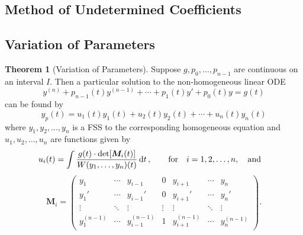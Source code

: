 \documentclass[10pt,UTF8]{article}
\newcommand{\mat}[1]{\bm{#1}}
\newenvironment{theoremBox}
{
  \begin{tcolorbox}[colback=yellow!5!white,colframe=yellow!75!black,parbox=false,before
  upper=\par,before lower=\par]}
  {
\end{tcolorbox}}
\theoremstyle{definition}
\newtheorem{definition inner}{Definition}[section]
\theoremstyle{definition}
\newtheorem{theorem inner}{Theorem}[section]
\newenvironment{theorem}[1][]
{
  \begin{theoremBox}
  \begin{theorem inner}[#1]\hfill\par}
    {
    \end{theorem inner}
\end{theoremBox}}
\theoremstyle{definition}
\newtheorem*{proof inner}{\textit{Proof}}
\theoremstyle{plain}
\newtheorem{tip inner}{Tip}[section]
\theoremstyle{remark}
\begin{document}
\subsection{Method of Undetermined Coefficients}


\subsection{Variation of Parameters}

\begin{theorem}[Variation of Parameters]
  {}\label{thm: Variation of Parameters}
  Suppose \(g, p_0,\ldots,p_{n-1}\) are continuous on an interval \(I\).
  Then a particular solution to the non-homogeneous linear ODE
  \begin{equation*}
    y^{(n)} + p_{n-1}(t) y^{(n-1)} + \cdots + p_1(t) y' + p_0(t) y = g(t)
  \end{equation*}
  can be found by
  \begin{equation*}
    y_p(t) = u_1(t) y_1(t) + u_2(t) y_2(t) + \cdots + u_n(t) y_n(t)
  \end{equation*}
  where \(y_1, y_2, \ldots, y_n\) is a FSS to the corresponding
  homogeneous equation
  and \(u_1, u_2, \ldots, u_n\) are functions given by
  \begin{equation*}
    u_i(t) = \int \frac{g(t) \cdot \det[\mat{M}_i(t)]}{W(y_1, \ldots, y_n)(t)} \dd{t},
    \quad\qfor i = 1, 2, \ldots, n, \qand
  \end{equation*}
  \begin{equation*}
    \mat{M}_i =
    \begin{pmatrix}
      y_1 & \cdots & y_{i-1} & 0 & y_{i+1} & \cdots & y_n \\
      y_1' & \cdots & y_{i-1}' & 0 & y_{i+1}' & \cdots & y_n' \\
      \vdots & \ddots & \vdots & \vdots & \vdots & \ddots & \vdots \\
      y_1^{(n-1)} & \cdots & y_{i-1}^{(n-1)} & 1 &
      y_{i+1}^{(n-1)} & \cdots & y_n^{(n-1)}
    \end{pmatrix}.
  \end{equation*}
\end{theorem}
\end{document}
